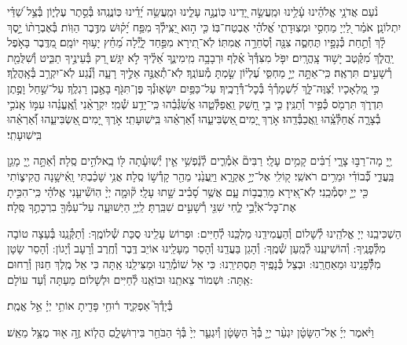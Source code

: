 \documentclass[twoside, openany, parskip=half, 11pt]{book}
\begin{document}
נֹ֨עַם אֲדֹנָ֥י אֱלֹהֵ֗ינוּ עָ֫לֵ֥ינוּ וּמַֽעֲשֵׂ֣ה יָ֭דֵינוּ כּֽוֹנֲנָ֣ה עָלֵ֑ינוּ וּמַֽעֲשֵׂ֥ה יָ֝דֵ֗ינוּ כּֽוֹנֲנֵֽהוּ׃
בְּ֯סֵ֣תֶר עֶלְי֑וֹן בְּ֯צֵ֥ל שַׁ֝דַּ֗י יִתְלוֹנָֽן׃
אֹמַ֗ר לַ֭יְיָ מַחְסִ֣י וּמְצֽוּדָתִ֑י אֱ֝לֹהַ֗י אֶבְטַח־בּֽוֹ׃
כִּ֤י ה֣וּא יַ֭צִּֽילְ֯ךָ מִפַּ֥ח יָ֝ק֗וּשׁ מִדֶּ֥בֶר הַוּֽוֹת׃
בְּ֯אֶבְרָת֨וֹ יָ֣סֶךְ לָ֗ךְ וְ֯תַ֣חַת כְּ֯נָפָ֣יו תֶּחְסֶ֑ה צִנָּ֖ה וְ֯סֹֽחֵרָ֣ה אֲמִתּֽוֹ׃
לֹֽא־תִ֭ירָא מִפַּ֣חַד לָ֑יְ֯לָה מֵ֝חֵ֗ץ יָע֥וּף יוֹמָֽם׃
מִ֭דֶּֽבֶר בָּאֹ֣פֶל יַֽהֲלֹ֑ךְ מִ֝קֶּ֗טֶב יָשׁ֥וּד צָֽהֳרָֽיִם׃
יִפֹּ֤ל מִצִּדְּ֯ךָ֙ אֶ֗לֶף וּרְבָבָ֥ה מִֽימִינֶ֑ךָ אֵ֝לֶ֗יךָ לֹ֣א יִגָּֽשׁ׃
רַ֭ק בְּ֯עֵינֶ֣יךָ תַבִּ֑יט וְ֯שִׁלֻּמַ֖ת רְ֯שָׁעִ֣ים תִּרְאֶֽה׃
כִּֽי־אַתָּ֣ה יְיָ֣ מַחְסִּ֑י עֶ֝לְי֗וֹן שַׂ֣מְתָּ מְ֯עוֹנֶֽךָ׃
לֹֽא־תְ֯אֻנֶּ֣ה אֵלֶ֣יךָ רָעָ֑ה וְ֯נֶ֗֝גַע לֹֽא־יִקְרַ֥ב בְּ֯אָֽהֳלֶֽךָ׃
כִּ֣י מַ֭לְאָכָיו יְ֯צַוֶּה־לָּ֑ךְ לִ֝שְׁמָרְ֯ךָ֗ בְּ֯כׇל־דְּ֯רָכֶֽיךָ׃
עַל־כַּפַּ֥יִם יִשָּׂא֑וּנְ֯ךָ פֶּן־תִּגֹּ֖ף בָּאֶ֣בֶן רַגְלֶֽךָ׃
עַל־שַׁ֣חַל וָפֶ֣תֶן תִּדְרֹ֑ךְ תִּרְמֹ֖ס כְּ֯פִ֣יר וְ֯תַנִּֽין׃
כִּ֤י בִ֣י חָ֭שַׁק וַֽאֲפַלְּ֯טֵ֑הוּ אֲשַׂ֝גְּ֯בֵ֗הוּ כִּֽי־יָדַ֥ע שְׁ֯מִֽי׃
יִקְרָאֵ֨נִי וְֽ֯אֶֽעֱנֵ֗הוּ עִמּ֣וֹ אָֽנֹכִ֣י בְ֯צָרָ֑ה אֲ֝חַלְּ֯צֵֽ֗הוּ וַֽאֲכַבְּ֯דֵֽהוּ׃
אֹ֣רֶךְ יָ֭מִים ֖אַשְׂבִּיעֵ֑הוּ וְ֝֯אַרְאֵ֗הוּ בִּֽישֽׁוּעָתִֽי׃
אֹ֣רֶךְ יָ֭מִים ֖אַשְׂבִּיעֵ֑הוּ וְ֝֯אַרְאֵ֗הוּ בִּֽישֽׁוּעָתִֽי׃

יְ֖יָ מָה־רַבּ֣וּ צָרָ֑י רַ֝בִּ֗ים קָמִ֥ים עָלָֽי׃ רַבִּים֘ אֹֽמְ֯רִ֢ים לְ֯נַ֫פְשִׁ֥י אֵ֤ין יְ֯שֽׁוּעָ֓תָה לּ֖וֹ בֵֽאלֹהִ֣ים סֶֽלָה׃ וְ֯אַתָּ֣ה יְ֖יָ מָגֵ֥ן בַּֽעֲדִ֑י כְּ֝֯בוֹדִ֗י וּמֵרִ֥ים רֹאשִֽׁי׃ ק֭וֹלִֽי אֶל־יְיָ֣ אֶקְרָ֑א וַיַּֽעֲנֵ֙נִי מֵהַ֖ר קָדְ֯שׁ֣וֹ סֶֽלָה׃ אֲנִ֥י שָׁכַ֗בְתִּי וָֽאִ֫ישָׁ֥נָה הֱקִיצ֑וֹתִי כִּ֖י יְיָ֣ יִסְמְ֯כֵֽנִי׃ לֹֽא־אִ֭ירָא מֵרִֽבֲב֥וֹת עָ֑ם אֲשֶׁ֥ר סָ֝בִ֗יב שָׁ֣תוּ עָלָֽי׃ ק֘וּמָ֤ה יְיָ֨ הֽוֹשִׁ֘יעֵ֤נִי אֱלֹהַ֗י כִּֽי־הִכִּ֣יתָ אֶת־כׇּל־אֹֽיְ֯בַ֣י לֶ֑חִי שִׁנֵּ֖י רְ֯שָׁעִ֣ים שִׁבַּֽרְתָּ׃ לַֽיְיָ֥ הַיְשׁוּעָ֑ה עַל־עַמְּ֯ךָ֖ בִרְכָתֶ֣ךָ סֶּֽלָה׃

הַשְׁכִּיבֵֽנוּ יְיָ אֱלֹהֵֽינוּ לְ֯שָׁלוֹם וְ֯הַעֲמִידֵֽנוּ מַלְכֵּֽנוּ לְ֯חַיִּים: וּפְרוֹשׂ עָלֵֽינוּ סֻכַּת שְׁ֯לוֹמֶֽךָ: וְ֯תַקְּ֯נֵֽנוּ בְּ֯עֵצָה טוֹבָה מִלְּ֯פָנֶֽיךָ: וְ֯הוֹשִׁיעֵֽנוּ לְ֯מַֽעַן שְׁ֯מֶֽךָ: וְ֯הָגֵן בַּעֲדֵֽנוּ וְ֯הָסֵר מֵעָלֵֽינוּ אוֹיֵב דֶּֽבֶר וְ֯חֶֽרֶב וְ֯רָעָב וְ֯יָגוֹן: וְ֯הָסֵר שָׂטָן מִלְּ֯֯פָנֵֽינוּ וּמֵאַחֲרֵֽנוּ: וּבְצֵל כְּ֯נָפֶֽיךָ תַּסְתִּירֵֽנוּ: כִּי אֵל שׁוֹמְ֯רֵֽנוּ וּמַצִּילֵֽנוּ אַֽתָּה כִּי אֵל מֶֽלֶךְ חַנּוּן וְ֯רַחוּם אַֽתָּה: וּשְׁמוֹר צֵאתֵֽנוּ וּבוֹאֵֽנוּ לְ֯חַיִּים וּלְשָׁלוֹם מֵעַתָּה וְ֯עַד עוֹלָם:

בְּ֯יָדְ֯ךָ֮ אַפְקִ֢יד ר֫וּחִ֥י פָּדִ֖יתָ אוֹתִ֥י יְיָ֗ אֵ֣ל אֱמֶֽת׃

וַיֹּ֨אמֶר יְיָ֜ אֶל־הַשָּׂטָ֗ן יִגְעַ֨ר יְיָ֤ בְּ֯ךָ֙ הַשָּׂטָ֔ן וְ֯יִגְעַ֤ר יְיָ֙ בְּ֯ךָ֔ הַבֹּחֵ֖ר בִּירֽוּשָׁלָ֑םִ הֲל֧וֹא זֶ֦ה א֖וּד מֻצָּ֥ל מֵאֵֽשׁ׃
\end{document}
